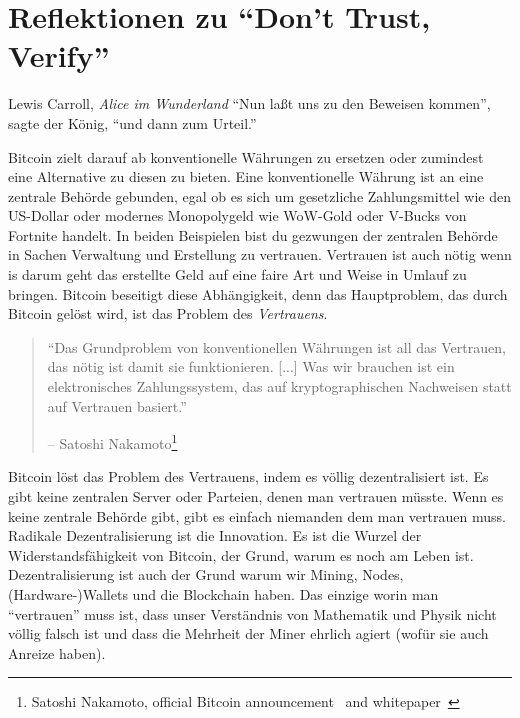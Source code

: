 \chapter{Reflektionen zu \enquote{Don't Trust, Verify}}
\label{les:16}

\begin{chapquote}{Lewis Carroll, \textit{Alice im Wunderland}}
\enquote{Nun laßt uns zu den Beweisen kommen}, sagte der König, \enquote{und dann zum Urteil.}
\end{chapquote}

Bitcoin zielt darauf ab konventionelle Währungen zu ersetzen oder zumindest eine
Alternative zu diesen zu bieten. Eine konventionelle Währung ist an eine
zentrale Behörde gebunden, egal ob es sich um gesetzliche Zahlungsmittel wie den
US-Dollar oder modernes Monopolygeld wie WoW-Gold oder V-Bucks von Fortnite
handelt. In beiden Beispielen bist du gezwungen der zentralen Behörde in Sachen
Verwaltung und Erstellung zu vertrauen. Vertrauen ist auch nötig wenn is darum
geht das erstellte Geld auf eine faire Art und Weise in Umlauf zu bringen.
Bitcoin beseitigt diese Abhängigkeit, denn das Hauptproblem, das durch Bitcoin
gelöst wird, ist das Problem des \textit{Vertrauens}.

\begin{quotation}\begin{samepage}
\enquote{Das Grundproblem von konventionellen Währungen ist all das Vertrauen,
das nötig ist damit sie funktionieren. [...] Was wir brauchen ist ein
elektronisches Zahlungssystem, das auf kryptographischen Nachweisen statt auf
Vertrauen basiert.}
\begin{flushright} -- Satoshi Nakamoto\footnote{Satoshi Nakamoto, official Bitcoin announcement~\cite{bitcoin-announcement} and whitepaper~\cite{whitepaper}}
\end{flushright}\end{samepage}\end{quotation}

Bitcoin löst das Problem des Vertrauens, indem es völlig dezentralisiert ist. Es
gibt keine zentralen Server oder Parteien, denen man vertrauen müsste. Wenn es
keine zentrale Behörde gibt, gibt es einfach niemanden dem man vertrauen muss.
Radikale Dezentralisierung ist die Innovation. Es ist die Wurzel der
Widerstandsfähigkeit von Bitcoin, der Grund, warum es noch am Leben ist.
Dezentralisierung ist auch der Grund warum wir Mining, Nodes, (Hardware-)Wallets
und die Blockchain haben. Das einzige worin man \enquote{vertrauen} muss ist,
dass unser Verständnis von Mathematik und Physik nicht völlig falsch ist
und dass die Mehrheit der Miner ehrlich agiert (wofür sie auch Anreize haben).

